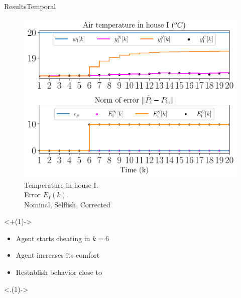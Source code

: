 \documentclass[handout,aspectratio=169]{beamer}
\begin{document}
\begin{frame}{Results}{Temporal}
  \centering
  \begin{minipage}[t]{.45\linewidth}
    \begin{figure}[h]
      \centering
      \includegraphics[width=1.\textwidth]{../img/resilient_eq/ErrorWX_command_normErrH.pdf}
      \caption*{Temperature in house I. \\Error $E_{I}(k)$.\\ {} Nominal, {} Selflish, {} Corrected}
    \end{figure}
  \end{minipage}
  \only<+(1)->{
    \begin{minipage}[t]{.50\linewidth}
      \begin{itemize}[<+(1)->]
        \item Agent starts cheating in $k=6$
        \item[\encircle{S}]  Agent increases its comfort
        \item[\encircle{C}] Restablish behavior close to 
      \end{itemize}

      \only<.(1)->{
        \centering
      }


\end{minipage}}
\end{frame}
\end{document}
